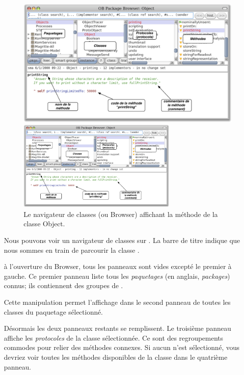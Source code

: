 \documentclass[a4paper,10pt,twoside]{book}
\begin{document}
\begin{figure}[htb]
\ifluluelse
	{\centerline {\includegraphics[width=\textwidth]{ClassBrowser1}}}
	{\centerline {\includegraphics[width=0.7\textwidth]{ClassBrowser1}}}
\caption{Le navigateur de classes (ou Browser) affichant la
  méthode  de la classe Object.
}
\end{figure}

Nous pouvons voir un navigateur de classes sur .
La barre de titre indique que nous sommes en train de parcourir la
classe .

à l'ouverture du Browser, tous les panneaux sont vides excepté le premier à gauche.
Ce premier panneau liste tous les \emph{paquetages} 
(en anglais, \emph{packages}) connus; 
ils contiennent des groupes de . %

Cette manipulation permet l'affichage dans le second panneau de toutes les
classes du paquetage sélectionné.

Désormais les deux panneaux restants se remplissent.
Le troisième panneau affiche les \emph{protocoles} de la classe
sélectionnée.
Ce sont des regroupements commodes pour relier des méthodes
connexes. Si aucun  n'est sélectionné, vous devriez
voir toutes les méthodes disponibles de la classe dans le
quatrième panneau.
\end{document}
